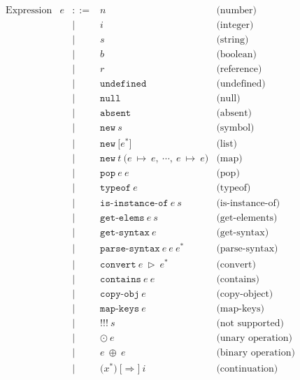 \documentclass[11pt]{article}
\newcommand{\Term}[1]{\texttt{#1}}
\begin{document}
\newpage

\[
\begin{array}{rrrll}
\text{Expression} & e & ::= & n & \text{(number)}\\
&&|& i & \text{(integer)}\\
&&|& s & \text{(string)}\\
&&|& b & \text{(boolean)}\\
&&|& r & \text{(reference)}\\
&&|& \Term{undefined} & \text{(undefined)}\\
&&|& \Term{null} & \text{(null)}\\
&&|& \Term{absent} & \text{(absent)}\\
&&|& \Term{new}\ s & \text{(symbol)}\\ %
&&|& \Term{new}\ \Term{[} e^* \Term{]} & \text{(list)}\\ %
&&|& \Term{new}\ t\ \Term{(} e\ \mapsto\ e,\ \cdots,\
e\ \mapsto\ e \Term{)} & \text{(map)}\\ %
&&|& \Term{pop}\ e\ e & \text{(pop)}\\
&&|& \Term{typeof}\ e & \text{(typeof)}\\
&&|& \Term{is-instance-of}\ e\ s& \text{(is-instance-of)}\\
&&|& \Term{get-elems}\ e\ s& \text{(get-elements)}\\
&&|& \Term{get-syntax}\ e& \text{(get-syntax)}\\
&&|& \Term{parse-syntax}\ e\ e\ e^*\ & \text{(parse-syntax)}\\
&&|& \Term{convert}\ e\ \triangleright\ e^*& \text{(convert)}\\
&&|& \Term{contains}\ e\ e& \text{(contains)}\\
&&|& \Term{copy-obj}\ e& \text{(copy-object)}\\
&&|& \Term{map-keys}\ e& \text{(map-keys)}\\
&&|& \Term{!!!}\ s& \text{(not supported)}\\
&&|& \odot\ e& \text{(unary operation)}\\ %
&&|& e\ \oplus\ e& \text{(binary operation)}\\ %
&&|& \Term{(} x^* \Term{)}\ \Term{[} \Rightarrow \Term{]}\ i
& \text{(continuation)}\\ %
\\

\end{array}
\]

\newpage
\end{document}
